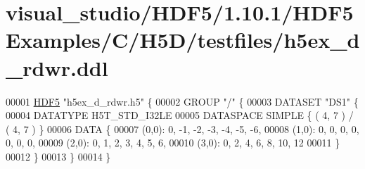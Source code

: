 \hypertarget{visual__studio_2_h_d_f5_21_810_81_2_h_d_f5_examples_2_c_2_h5_d_2testfiles_2h5ex__d__rdwr_8ddl_source}{}\section{visual\+\_\+studio/\+H\+D\+F5/1.10.1/\+H\+D\+F5\+Examples/\+C/\+H5\+D/testfiles/h5ex\+\_\+d\+\_\+rdwr.ddl}
\label{visual__studio_2_h_d_f5_21_810_81_2_h_d_f5_examples_2_c_2_h5_d_2testfiles_2h5ex__d__rdwr_8ddl_source}

\begin{DoxyCode}
00001 \hyperlink{namespace_h_d_f5}{HDF5} \textcolor{stringliteral}{"h5ex\_d\_rdwr.h5"} \{
00002 GROUP \textcolor{stringliteral}{"/"} \{
00003    DATASET \textcolor{stringliteral}{"DS1"} \{
00004       DATATYPE  H5T\_STD\_I32LE
00005       DATASPACE  SIMPLE \{ ( 4, 7 ) / ( 4, 7 ) \}
00006       DATA \{
00007       (0,0): 0, -1, -2, -3, -4, -5, -6,
00008       (1,0): 0, 0, 0, 0, 0, 0, 0,
00009       (2,0): 0, 1, 2, 3, 4, 5, 6,
00010       (3,0): 0, 2, 4, 6, 8, 10, 12
00011       \}
00012    \}
00013 \}
00014 \}
\end{DoxyCode}
